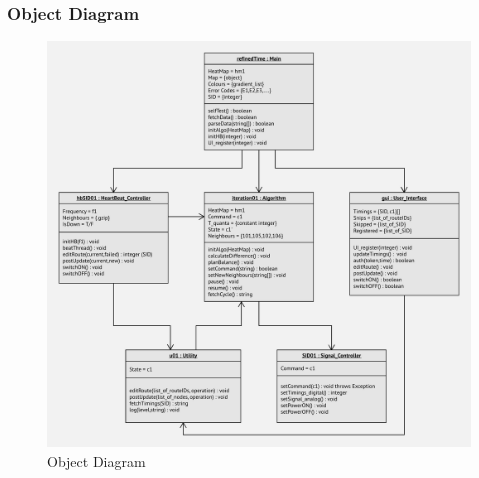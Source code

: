 \documentclass[12pt,a4paper,final]{report}
\begin{document}
\subsubsection{Object Diagram}
	\begin{figure}[!h]
		\begin{center}
			\includegraphics[scale=0.6]{Diagrams/Object_Diagram.jpeg}
		\end{center}
		\caption{Object Diagram}
	\end{figure}
\newpage
\end{document}
